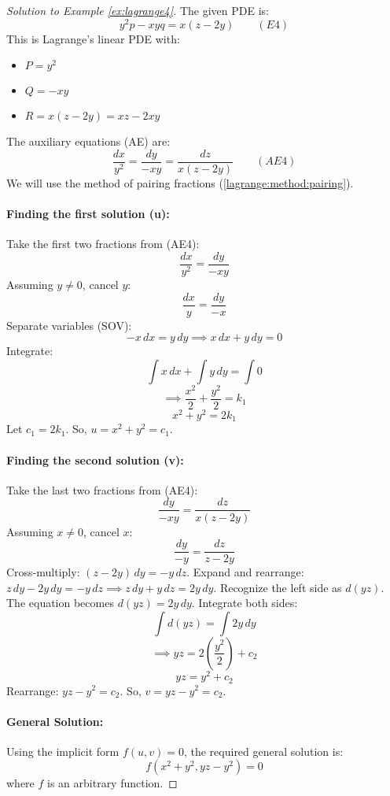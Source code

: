 \documentclass{article}
\theoremstyle{remark}
\begin{document}
	\begin{proof}[Solution to Example \ref{ex:lagrange4}]
		The given PDE is:
		\[ y^2p - xyq = x(z-2y) \quad \quad (E4) \]
		This is Lagrange's linear PDE with:
		\begin{itemize}
			\item $P = y^2$
			\item $Q = -xy$
			\item $R = x(z-2y) = xz - 2xy$
		\end{itemize}
		The auxiliary equations (AE) are:
		\[ \frac{dx}{y^2} = \frac{dy}{-xy} = \frac{dz}{x(z-2y)} \quad \quad (AE4) \]
		We will use the method of pairing fractions (\ref{lagrange:method:pairing}).
		
		\paragraph{Finding the first solution (u):}
		Take the first two fractions from (AE4):
		\[ \frac{dx}{y^2} = \frac{dy}{-xy} \]
		Assuming $y \neq 0$, cancel $y$:
		\[ \frac{dx}{y} = \frac{dy}{-x} \]
		Separate variables (SOV):
		\[ -x \, dx = y \, dy \implies x \, dx + y \, dy = 0 \]
		Integrate:
		\[ \int x \, dx + \int y \, dy = \int 0 \]
		\[ \implies \frac{x^2}{2} + \frac{y^2}{2} = k_1 \]
		\[ x^2 + y^2 = 2k_1 \]
		Let $c_1 = 2k_1$. So, $u = x^2 + y^2 = c_1$.
		
		\paragraph{Finding the second solution (v):}
		Take the last two fractions from (AE4):
		\[ \frac{dy}{-xy} = \frac{dz}{x(z-2y)} \]
		Assuming $x \neq 0$, cancel $x$:
		\[ \frac{dy}{-y} = \frac{dz}{z-2y} \]
		Cross-multiply: $(z-2y) \, dy = -y \, dz$.
		Expand and rearrange: $z \, dy - 2y \, dy = -y \, dz \implies z \, dy + y \, dz = 2y \, dy$.
		Recognize the left side as $d(yz)$. The equation becomes $d(yz) = 2y \, dy$.
		Integrate both sides:
		\[ \int d(yz) = \int 2y \, dy \]
		\[ \implies yz = 2 \left( \frac{y^2}{2} \right) + c_2 \]
		\[ yz = y^2 + c_2 \]
		Rearrange: $yz - y^2 = c_2$.
		So, $v = yz - y^2 = c_2$.
		
		\paragraph{General Solution:}
		Using the implicit form $f(u, v) = 0$, the required general solution is:
		\[ f(x^2 + y^2, yz - y^2) = 0 \]
		where $f$ is an arbitrary function.
	\end{proof}
	
\end{document}
